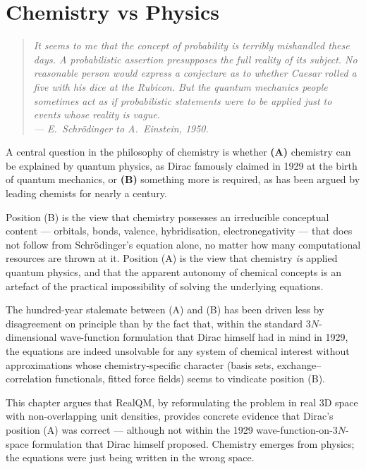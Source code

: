 \chapter{Chemistry vs Physics}\label{ch:chemvphys}

\begin{quote}
\itshape It seems to me that the concept of probability is terribly mishandled these days. A probabilistic assertion presupposes the full reality of its subject. No reasonable person would express a conjecture as to whether Caesar rolled a five with his dice at the Rubicon. But the quantum mechanics people sometimes act as if probabilistic statements were to be applied \emph{just} to events whose reality is vague.\\
\normalfont\hfill --- E.~Schr\"odinger to A.~Einstein, 1950.
\end{quote}
\bigskip

A central question in the philosophy of chemistry is whether \textbf{(A)} chemistry can be explained by quantum physics, as Dirac famously claimed in 1929 at the birth of quantum mechanics, or \textbf{(B)} something more is required, as has been argued by leading chemists for nearly a century.

Position (B) is the view that chemistry possesses an irreducible conceptual content --- orbitals, bonds, valence, hybridisation, electronegativity --- that does not follow from Schr\"odinger's equation alone, no matter how many computational resources are thrown at it. Position (A) is the view that chemistry \emph{is} applied quantum physics, and that the apparent autonomy of chemical concepts is an artefact of the practical impossibility of solving the underlying equations.

The hundred-year stalemate between (A) and (B) has been driven less by disagreement on principle than by the fact that, within the standard $3N$-dimensional wave-function formulation that Dirac himself had in mind in 1929, the equations are indeed unsolvable for any system of chemical interest without approximations whose chemistry-specific character (basis sets, exchange--correlation functionals, fitted force fields) seems to vindicate position (B).

This chapter argues that RealQM, by reformulating the problem in real 3D space with non-overlapping unit densities, provides concrete evidence that Dirac's position (A) was correct --- although not within the 1929 wave-function-on-$3N$-space formulation that Dirac himself proposed. Chemistry emerges from physics; the equations were just being written in the wrong space.

